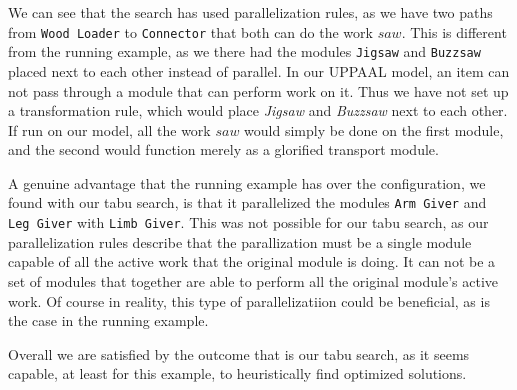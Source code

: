We can see that the search has used parallelization rules, as we have two paths from \texttt{Wood Loader} to \texttt{Connector} that both can do the work $saw$. This is different from the running example, as we there had the modules \texttt{Jigsaw} and \texttt{Buzzsaw} placed next to each other instead of parallel. In our UPPAAL model, an item can not pass through a module that can perform work on it. Thus we have not set up a transformation rule, which would place \textit{Jigsaw} and \textit{Buzzsaw} next to each other. If run on our model, all the work $saw$ would simply be done on the first module, and the second would function merely as a glorified transport module.

A genuine advantage that the running example has over the configuration, we found with our tabu search, is that it parallelized the modules \texttt{Arm Giver} and \texttt{Leg Giver} with \texttt{Limb Giver}. This was not possible for our tabu search, as our parallelization rules describe that the parallization must be a single module capable of all the active work that the original module is doing. It can not be a set of modules that together are able to perform all the original module's active work. Of course in reality, this type of parallelizatiion could be beneficial, as is the case in the running example.

Overall we are satisfied by the outcome that is our tabu search, as it seems capable, at least for this example, to heuristically find optimized solutions.

